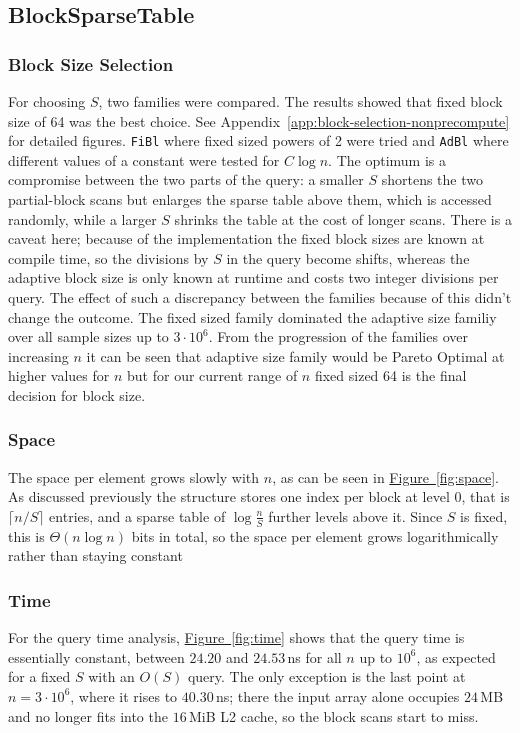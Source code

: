 \documentclass[a4paper,UKenglish,cleveref,thm-restate]{lipics-v2021}
\begin{document}
\subsection{BlockSparseTable}
\subsubsection{Block Size Selection}
For choosing $S$, two families were compared. The results showed that fixed block size of 64 was the best choice. See Appendix~\ref{app:block-selection-nonprecompute} for detailed figures.
\texttt{FiBl} where fixed sized powers of 2 were tried and \texttt{AdBl} where different values of a constant were tested for $C \log n$.
The optimum is a compromise between the two parts of the query: a smaller $S$ shortens the two partial-block scans but enlarges the sparse table above them, which is accessed randomly, while a larger $S$ shrinks the table at the cost of longer scans.
There is a caveat here; because of the implementation the fixed block sizes are known at compile time, so the divisions by $S$ in the query become shifts, whereas the adaptive block size is only known at runtime and costs two integer divisions per query.
The effect of such a discrepancy between the families because of this didn't change the outcome.
The fixed sized family dominated the adaptive size familiy over all sample sizes up to $3 \cdot 10^6$.
From the progression of the families over increasing $n$ it can be seen that adaptive size family would be Pareto Optimal at higher values for $n$ but for our current range of $n$ fixed sized 64 is the final decision for block size.

\subsubsection{Space}
The space per element grows slowly with $n$, as can be seen in \hyperref[fig:space]{Figure~\ref*{fig:space}}.
As discussed previously the structure stores one index per block at level $0$, that is $\lceil n/S \rceil$ entries, and a sparse table of $\log \frac{n}{S}$ further levels above it.
Since $S$ is fixed, this is $\Theta(n \log n)$ bits in total, so the space per element grows logarithmically rather than staying constant
\subsubsection{Time}
For the query time analysis, \hyperref[fig:time]{Figure~\ref*{fig:time}} shows that the query time is essentially constant, between $24.20$ and $24.53$\,ns for all $n$ up to $10^6$, as expected for a fixed $S$ with an $O(S)$ query.
The only exception is the last point at $n=3 \cdot 10^6$, where it rises to $40.30$\,ns; there the input array alone occupies $24$\,MB and no longer fits into the $16$\,MiB L2 cache, so the block scans start to miss.
\end{document}
